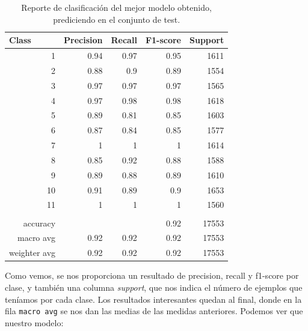 \documentclass[a4paper, 20pt]{article}
\begin{document}
\begin{table}[H]
  \centering
\begin{tabular}{rrrrr}
\multicolumn{1}{l}{Class} & Precision & Recall & F1-score & Support \\ \hline
1                         & 0.94      & 0.97   & 0.95     & 1611    \\
2                         & 0.88      & 0.9    & 0.89     & 1554    \\
3                         & 0.97      & 0.97   & 0.97     & 1565    \\
4                         & 0.97      & 0.98   & 0.98     & 1618    \\
5                         & 0.89      & 0.81   & 0.85     & 1603    \\
6                         & 0.87      & 0.84   & 0.85     & 1577    \\
7                         & 1         & 1      & 1        & 1614    \\
8                         & 0.85      & 0.92   & 0.88     & 1588    \\
9                         & 0.89      & 0.88   & 0.89     & 1610    \\
10                        & 0.91      & 0.89   & 0.9      & 1653    \\
11                        & 1         & 1      & 1        & 1560    \\
                          &           &        &          &         \\
accuracy                  &           &        & 0.92     & 17553   \\
macro avg                 & 0.92      & 0.92   & 0.92     & 17553   \\
weighter avg              & 0.92      & 0.92   & 0.92     & 17553  
\end{tabular}

\caption{Reporte de clasificación del mejor modelo obtenido, prediciendo en el conjunto de test.}
\end{table}

Como vemos, se nos proporciona un resultado de precision, recall y f1-score por clase, y también una columna \emph{support}, que nos indica el número de ejemplos que teníamos por cada clase. Los resultados interesantes quedan al final, donde en la fila \lstinline{macro avg} se nos dan las medias de las medidas anteriores. Podemos ver que nuestro modelo:
\end{document}
